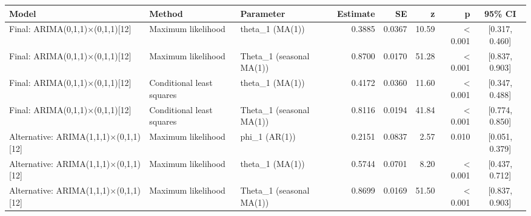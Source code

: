 
\begin{tabular}[t]{lllrrrrc}
\toprule
Model & Method & Parameter & Estimate & SE & z & p & 95\% CI\\
\midrule
Final: ARIMA(0,1,1)×(0,1,1)[12] & Maximum likelihood & theta\_1 (MA(1)) & 0.3885 & 0.0367 & 10.59 & < 0.001 & {}[0.317, 0.460]\\
Final: ARIMA(0,1,1)×(0,1,1)[12] & Maximum likelihood & Theta\_1 (seasonal MA(1)) & 0.8700 & 0.0170 & 51.28 & < 0.001 & {}[0.837, 0.903]\\
Final: ARIMA(0,1,1)×(0,1,1)[12] & Conditional least squares & theta\_1 (MA(1)) & 0.4172 & 0.0360 & 11.60 & < 0.001 & {}[0.347, 0.488]\\
Final: ARIMA(0,1,1)×(0,1,1)[12] & Conditional least squares & Theta\_1 (seasonal MA(1)) & 0.8116 & 0.0194 & 41.84 & < 0.001 & {}[0.774, 0.850]\\
Alternative: ARIMA(1,1,1)×(0,1,1)[12] & Maximum likelihood & phi\_1 (AR(1)) & 0.2151 & 0.0837 & 2.57 & 0.010 & {}[0.051, 0.379]\\
Alternative: ARIMA(1,1,1)×(0,1,1)[12] & Maximum likelihood & theta\_1 (MA(1)) & 0.5744 & 0.0701 & 8.20 & < 0.001 & {}[0.437, 0.712]\\
Alternative: ARIMA(1,1,1)×(0,1,1)[12] & Maximum likelihood & Theta\_1 (seasonal MA(1)) & 0.8699 & 0.0169 & 51.50 & < 0.001 & {}[0.837, 0.903]\\
\bottomrule
\end{tabular}
